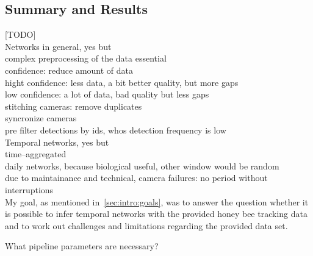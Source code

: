 \subsection{Summary and Results}
[TODO]\\

Networks in general, yes but\\
complex preprocessing of the data essential\\
confidence: reduce amount of data\\
hight confidence: less data, a bit better quality, but more gaps\\
low confidence: a lot of data, bad quality but less gaps\\
stitching cameras: remove duplicates\\
syncronize cameras\\
pre filter detections by ids, whos detection frequency is low\\

Temporal networks, yes but\\
time--aggregated\\
daily networks, because biological useful, other window would be random\\
due to maintainance and technical, camera failures: no period without interruptions\\


My goal, as mentioned in~\ref{sec:intro:goals}, was to answer the question whether it is possible to infer temporal networks with the provided honey bee tracking data and to work out challenges and limitations regarding the provided data set.

What pipeline parameters are necessary?